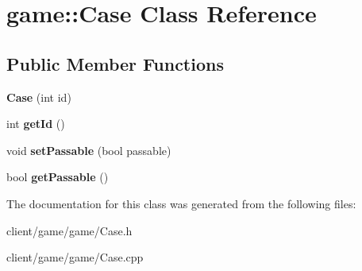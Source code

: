 \hypertarget{classgame_1_1_case}{\section{game\-:\-:Case Class Reference}
\label{classgame_1_1_case}
}
\subsection*{Public Member Functions}
\begin{DoxyCompactItemize}
\item 
\hypertarget{classgame_1_1_case_a883b5795c2f7a94ca7470dd30a957662}{{\bfseries Case} (int id)}\label{classgame_1_1_case_a883b5795c2f7a94ca7470dd30a957662}

\item 
\hypertarget{classgame_1_1_case_a6d8215e74d67f866fd5701cb435d4a4f}{int {\bfseries get\-Id} ()}\label{classgame_1_1_case_a6d8215e74d67f866fd5701cb435d4a4f}

\item 
\hypertarget{classgame_1_1_case_a3113c9e7af0cf76e06203646a1a2184f}{void {\bfseries set\-Passable} (bool passable)}\label{classgame_1_1_case_a3113c9e7af0cf76e06203646a1a2184f}

\item 
\hypertarget{classgame_1_1_case_a0964a92811215ad3afd6a5bc826e94c2}{bool {\bfseries get\-Passable} ()}\label{classgame_1_1_case_a0964a92811215ad3afd6a5bc826e94c2}

\end{DoxyCompactItemize}


The documentation for this class was generated from the following files\-:\begin{DoxyCompactItemize}
\item 
client/game/game/Case.\-h\item 
client/game/game/Case.\-cpp\end{DoxyCompactItemize}
